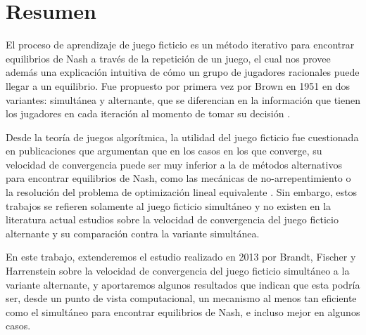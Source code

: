 \chapter*{Resumen}


El proceso de aprendizaje de juego ficticio es un método iterativo para encontrar equilibrios de Nash a través de la repetición de un juego, el cual nos provee además una explicación intuitiva de cómo un grupo de jugadores racionales puede llegar a un equilibrio. Fue propuesto por primera vez por Brown en 1951 en dos variantes: simultánea y alternante, que se diferencian en la información que tienen los jugadores en cada iteración al momento de tomar su decisión \cite{brown:1951}.

Desde la teoría de juegos algorítmica, la utilidad del juego ficticio fue cuestionada en publicaciones que argumentan que en los casos en los que converge, su velocidad de convergencia puede ser muy inferior a la de métodos alternativos para encontrar equilibrios de Nash, como las mecánicas de no-arrepentimiento o la resolución del problema de optimización lineal equivalente \cite{modified:fp:linear}. Sin embargo, estos trabajos se refieren solamente al juego ficticio simultáneo y no existen en la literatura actual estudios sobre la velocidad de convergencia del juego ficticio alternante y su comparación contra la variante simultánea.

En este trabajo, extenderemos el estudio realizado en 2013 por Brandt, Fischer y Harrenstein \cite{brandt:rate:convergence} sobre la velocidad de convergencia del juego ficticio simultáneo a la variante alternante, y aportaremos algunos resultados que indican que esta podría ser, desde un punto de vista computacional, un mecanismo al menos tan eficiente como el simultáneo para encontrar equilibrios de Nash, e incluso mejor en algunos casos.